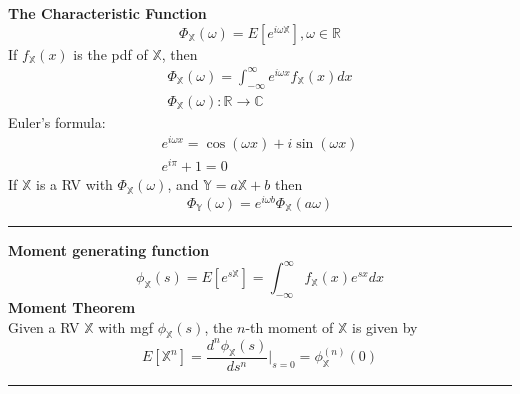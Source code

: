\documentclass{article}
\providecommand{\X}{\mathbb{X}}
\providecommand{\Y}{\mathbb{Y}}
\providecommand{\R}{\mathbb{R}}
\providecommand{\C}{\mathbb{C}}
\begin{document}
\begin{multicols*}{3}
        \textbf{The Characteristic Function}
        \begin{equation*}
            \Phi_{\X}(\omega) = E[e^{i\omega\X}], \omega\in\R
        \end{equation*}
        If $f_\X(x)$ is the pdf of $\X$, then
        \begin{equation*}
            \begin{gathered}
                \Phi_{\X}(\omega) = \int_{-\infty}^{\infty} e^{i\omega x}f_\X(x)dx\\
                \Phi_{\X}(\omega): \R\rightarrow\C
            \end{gathered}
        \end{equation*}
        Euler's formula:
        \begin{equation*}
            \begin{gathered}
                e^{i\omega x} = \cos(\omega x) + i\sin(\omega x)\\
                e^{i\pi} + 1 = 0
            \end{gathered}
        \end{equation*}
        If $\X$ is a RV with $\Phi_\X(\omega)$, and $\Y=a\X + b$ then
        \begin{equation*}
            \Phi_{\Y}(\omega) = e^{i\omega b}\Phi_{\X}(a\omega)
        \end{equation*}

        \noindent\rule{\columnwidth}{0.4pt}

        \textbf{Moment generating function}
        \begin{equation*}
            \phi_{\X}(s) = E[e^{s\X}] = \int_{-\infty}^{\infty}f_\X(x)e^{sx}dx
        \end{equation*}
        \textbf{Moment Theorem}\\
        Given a RV $\X$ with mgf $\phi_\X(s)$, the $n$-th moment of $\X$ is given by
        \begin{equation*}
            E[\X^n] = \frac{d^n\phi_\X(s)}{ds^n}\rvert_{s=0} = \phi_{\X}^{(n)}(0)
        \end{equation*}

        \noindent\rule{\columnwidth}{0.4pt}


\end{multicols*}
\end{document}
